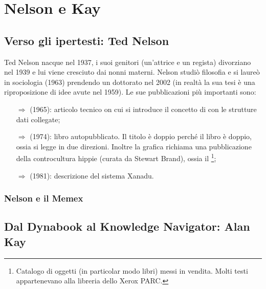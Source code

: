 \chapter{Nelson e Kay}

\section{Verso gli ipertesti: Ted Nelson}

Ted Nelson nacque nel 1937, i suoi genitori (un'attrice e un regista) divorziano nel 1939 e lui viene cresciuto dai nonni
materni. Nelson studiò filosofia e si laureò in sociologia (1963) prendendo un dottorato nel 
2002 (in realtà la sua tesi è una riproposizione di idee avute nel 1959).
Le sue pubblicazioni più importanti sono:

\begin{itemize}
    \item [$\Rightarrow$]  (1965): 
    articolo tecnico on cui si introduce il concetto di  con le strutture dati collegate;
    \item [$\Rightarrow$]  (1974): libro autopubblicato.
    Il titolo è doppio perché il libro è doppio, ossia si legge in due direzioni.
    Inoltre la grafica richiama una pubblicazione della controcultura hippie (curata da Stewart Brand),
    ossia il \footnote{Catalogo di oggetti (in particolar modo libri)
    messi in vendita. Molti testi appartenevano alla libreria dello Xerox PARC.};
    \item [$\Rightarrow$]  (1981): descrizione del sistema Xanadu.
\end{itemize}



\subsection{Nelson e il Memex}

\section{Dal Dynabook al Knowledge Navigator: Alan Kay}
